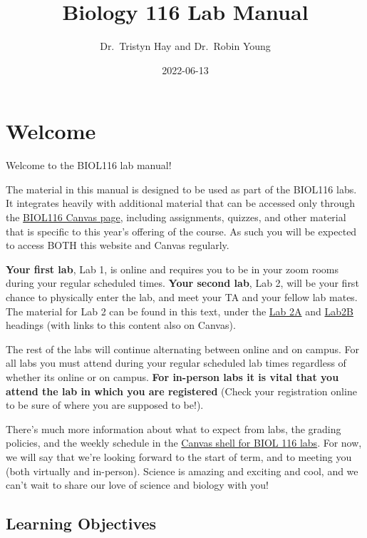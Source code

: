 \documentclass[
]{book}
\title{Biology 116 Lab Manual}
\author{Dr.~Tristyn Hay and Dr.~Robin Young}
\date{2022-06-13}
\begin{document}
\maketitle

{
\setcounter{tocdepth}{1}
\tableofcontents
}
\hypertarget{welcome}{%
\chapter*{Welcome}\label{welcome}}

Welcome to the BIOL116 lab manual!

The material in this manual is designed to be used as part of the BIOL116 labs. It integrates heavily with additional material that can be accessed only through the \href{https://canvas.ubc.ca/courses/94572}{BIOL116 Canvas page}, including assignments, quizzes, and other material that is specific to this year's offering of the course. As such you will be expected to access BOTH this website and Canvas regularly.

\textbf{Your first lab}, Lab 1, is online and requires you to be in your zoom rooms during your regular scheduled times. \textbf{Your second lab}, Lab 2, will be your first chance to physically enter the lab, and meet your TA and your fellow lab mates. The material for Lab 2 can be found in this text, under the \href{https://ubco-biology.github.io/BIOL-116-Lab-Manual/the-process-of-science.html}{Lab 2A} and \href{https://ubco-biology.github.io/BIOL-116-Lab-Manual/research-project.html}{Lab2B} headings (with links to this content also on Canvas).

The rest of the labs will continue alternating between online and on campus. For all labs you must attend during your regular scheduled lab times regardless of whether its online or on campus. \textbf{For in-person labs it is vital that you attend the lab in which you are registered} (Check your registration online to be sure of where you are supposed to be!).

There's much more information about what to expect from labs, the grading policies, and the weekly schedule in the \href{https://canvas.ubc.ca}{Canvas shell for BIOL 116 labs}. For now, we will say that we're looking forward to the start of term, and to meeting you (both virtually and in-person). Science is amazing and exciting and cool, and we can't wait to share our love of science and biology with you!

\hypertarget{learning-objectives}{%
\section*{Learning Objectives}\label{learning-objectives}}
\end{document}
